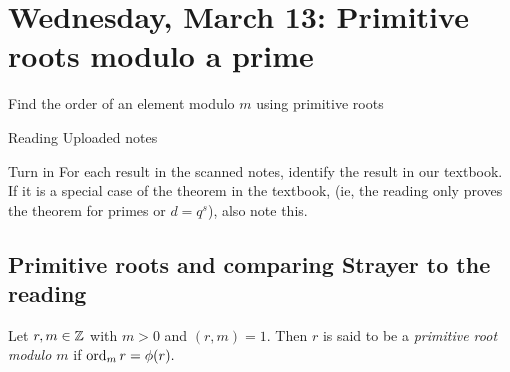\documentclass[letterpaper, 11 pt]{ximera}
\begin{document}
\section{Wednesday, March 13: Primitive roots modulo a prime}

\begin{obj}
    \item Find the order of an element modulo $m$ using primitive roots
\end{obj}


\begin{pre}
    \item[Reading] Uploaded notes
    \item[Turn in] For each result in the scanned notes, identify the result in our textbook. If it is a special case of the theorem in the textbook, (ie, the reading only proves the theorem for primes or $d=q^s$), also note this.

\end{pre}

\subsection{Primitive roots and comparing Strayer to the reading}
\begin{definition}\label{defn:prime-root}
    Let $r,m\in\mathbb Z$ with $m>0$ and $(r,m)=1.$ Then $r$ is said to be a \emph{primitive root modulo $m$} if $\operatorname{ord}_m r=\phi(r).$
\end{definition}
\end{document}
